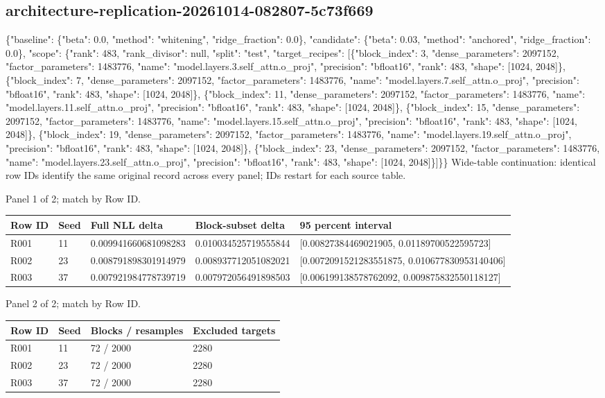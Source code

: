 \documentclass[10pt]{article}
\begin{document}
\subsection{architecture-replication-20261014-082807-5c73f669}
\{"baseline": \{"beta": 0.0, "method": "whitening", "ridge\_fraction": 0.0\}, "candidate": \{"beta": 0.03, "method": "anchored", "ridge\_fraction": 0.0\}, "scope": \{"rank": 483, "rank\_divisor": null, "split": "test", "target\_recipes": [\{"block\_index": 3, "dense\_parameters": 2097152, "factor\_parameters": 1483776, "name": "model.layers.3.self\_attn.o\_proj", "precision": "bfloat16", "rank": 483, "shape": [1024, 2048]\}, \{"block\_index": 7, "dense\_parameters": 2097152, "factor\_parameters": 1483776, "name": "model.layers.7.self\_attn.o\_proj", "precision": "bfloat16", "rank": 483, "shape": [1024, 2048]\}, \{"block\_index": 11, "dense\_parameters": 2097152, "factor\_parameters": 1483776, "name": "model.layers.11.self\_attn.o\_proj", "precision": "bfloat16", "rank": 483, "shape": [1024, 2048]\}, \{"block\_index": 15, "dense\_parameters": 2097152, "factor\_parameters": 1483776, "name": "model.layers.15.self\_attn.o\_proj", "precision": "bfloat16", "rank": 483, "shape": [1024, 2048]\}, \{"block\_index": 19, "dense\_parameters": 2097152, "factor\_parameters": 1483776, "name": "model.layers.19.self\_attn.o\_proj", "precision": "bfloat16", "rank": 483, "shape": [1024, 2048]\}, \{"block\_index": 23, "dense\_parameters": 2097152, "factor\_parameters": 1483776, "name": "model.layers.23.self\_attn.o\_proj", "precision": "bfloat16", "rank": 483, "shape": [1024, 2048]\}]\}\}
Wide-table continuation: identical row IDs identify the same original record across every panel; IDs restart for each source table.
\par\noindent Panel 1 of 2; match by Row ID.
{\scriptsize\setlength{\tabcolsep}{2pt}
\begin{longtable}{p{}p{}p{}p{}p{}}
Row ID & Seed & Full NLL delta & Block-subset delta & 95 percent interval \\
\hline\endhead
R001 & 11 & 0.009941660681098283 & 0.010034525719555844 & [0.00827384469021905, 0.01189700522595723] \\
R002 & 23 & 0.008791898301914979 & 0.008937712051082021 & [0.0072091521283551875, 0.010677830953140406] \\
R003 & 37 & 0.007921984778739719 & 0.007972056491898503 & [0.006199138578762092, 0.009875832550118127] \\
\end{longtable}}
\par\noindent Panel 2 of 2; match by Row ID.
{\scriptsize\setlength{\tabcolsep}{2pt}
\begin{longtable}{p{}p{}p{}p{}}
Row ID & Seed & Blocks / resamples & Excluded targets \\
\hline\endhead
R001 & 11 & 72 / 2000 & 2280 \\
R002 & 23 & 72 / 2000 & 2280 \\
R003 & 37 & 72 / 2000 & 2280 \\
\end{longtable}}
\end{document}
